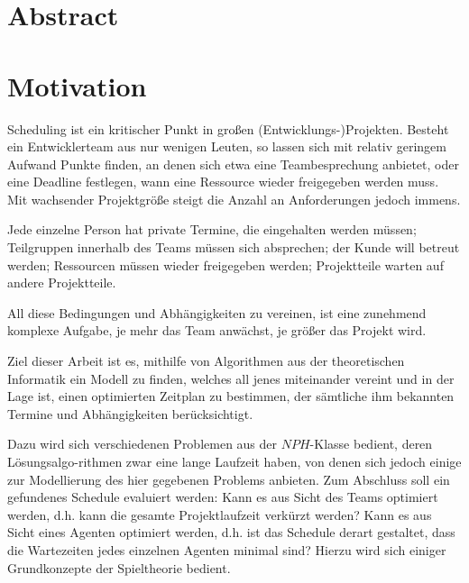 \documentclass[12pt,twoside]{article}
\theoremstyle{plain}
\theoremstyle{definition}
\theoremstyle{remark}
\begin{document}
\thispagestyle{empty}
\hspace{1cm}
\newpage


\section*{Abstract}
\lipsum[99]
\setcounter{tocdepth}{3} 					%
\tableofcontents
{}
\clearpage

\section{Motivation}
\label{sec:intro}
Scheduling ist ein kritischer Punkt in großen (Entwicklungs-)Projekten.
Besteht ein Entwicklerteam aus nur wenigen Leuten, so lassen sich mit relativ geringem Aufwand Punkte finden, an denen sich etwa eine Teambesprechung anbietet, oder eine Deadline festlegen, wann eine Ressource wieder freigegeben werden muss.
Mit wachsender Projektgröße steigt die Anzahl an Anforderungen jedoch immens.

Jede einzelne Person hat private Termine, die eingehalten werden müssen; Teilgruppen innerhalb des Teams müssen sich absprechen; der Kunde will betreut werden; Ressourcen müssen wieder freigegeben werden; Projektteile warten auf andere Projektteile.

All diese Bedingungen und Abhängigkeiten zu vereinen, ist eine zunehmend komplexe Aufgabe, je mehr das Team anwächst, je größer das Projekt wird.

Ziel dieser Arbeit ist es, mithilfe von Algorithmen aus der theoretischen Informatik ein Modell zu finden, welches all jenes miteinander vereint und in der Lage ist, einen optimierten Zeitplan zu bestimmen, der sämtliche ihm bekannten Termine und Abhängigkeiten berücksichtigt.

Dazu wird sich verschiedenen Problemen aus der $NPH$-Klasse bedient, deren Lösungsalgo-rithmen zwar eine lange Laufzeit haben, von denen sich jedoch einige zur Modellierung des hier gegebenen Problems anbieten.
Zum Abschluss soll ein gefundenes Schedule evaluiert werden:
Kann es aus Sicht des Teams optimiert werden, d.h. kann die gesamte Projektlaufzeit verkürzt werden?
Kann es aus Sicht eines Agenten optimiert werden, d.h. ist das Schedule derart gestaltet, dass die Wartezeiten jedes einzelnen Agenten minimal sind?
Hierzu wird sich einiger Grundkonzepte der Spieltheorie bedient.
\end{document}
